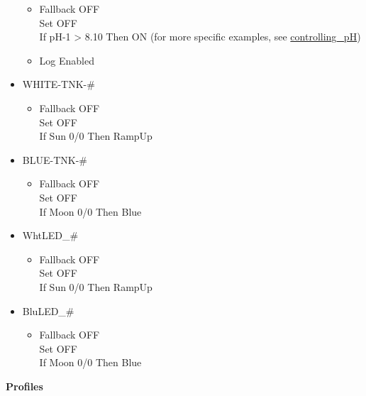 \documentclass[
]{book}
\providecommand{\tightlist}{%
  \setlength{\itemsep}{0pt}\setlength{\parskip}{0pt}}
\begin{document}
\begin{itemize}
  \begin{itemize}
  \tightlist
  \item
    Fallback OFF\\
    Set OFF\\
    If pH-1 \textgreater{} 8.10 Then ON (for more specific examples, see \protect\hyperlink{controlling_pH}{controlling\_pH})\\
  \item
    Log Enabled\\
  \end{itemize}
\item
  WHITE-TNK-\#

  \begin{itemize}
  \tightlist
  \item
    Fallback OFF\\
    Set OFF\\
    If Sun 0/0 Then RampUp\\
  \end{itemize}
\item
  BLUE-TNK-\#

  \begin{itemize}
  \tightlist
  \item
    Fallback OFF\\
    Set OFF\\
    If Moon 0/0 Then Blue\\
  \end{itemize}
\item
  WhtLED\_\#

  \begin{itemize}
  \tightlist
  \item
    Fallback OFF\\
    Set OFF\\
    If Sun 0/0 Then RampUp\\
  \end{itemize}
\item
  BluLED\_\#

  \begin{itemize}
  \tightlist
  \item
    Fallback OFF\\
    Set OFF\\
    If Moon 0/0 Then Blue
  \end{itemize}
\end{itemize}

\textbf{Profiles}
\end{document}
